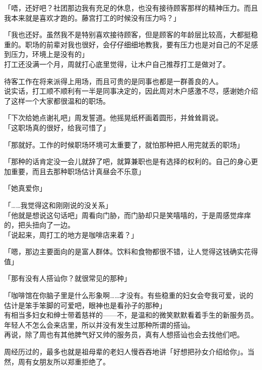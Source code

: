 「唔，还好吧？社团那边我有充足的休息，也没有接待顾客那样的精神压力。而且我本来就是喜欢才跑的。藤宫打工的时候没有压力吗？」

「我也还好。虽然我不是特别喜欢接待顾客，但是顾客的年龄层比较高，大都挺稳重的。职场的前辈对我也很好，会仔仔细细地教我，要有压力也是对自己的不足感到压力，环境上是没有的」\\

打工还没满一个月，周就打心底里觉得，让木户自己推荐打工是做对了。

待客工作在将来派得上用场，而且可贵的是同事也都是一群善良的人。\\

说实话，打工顺不顺利有一半是同事决定的，因此周对木户感激不尽，感谢她介绍了这样一个大家都很温和的职场。

「下次给她点谢礼吧」周发誓道。他摇晃纸杯画着圆形，并耸耸肩说。\\

「这职场真的很好，给我可惜了」

「那就好。工作的时候职场环境可太重要了，就怕那种把人用完就丢的职场」

「那种的话肯定没一会儿就辞了吧，就算兼职也是有选择的权利的。自己的身心更加重要，而且去那种职场估计真昼会不乐意」

「她真爱你」

「……我觉得这和刚刚说的没关系」\\

「他就是想说这句话吧」周看向门胁，而门胁却只是笑嘻嘻的，于是周感觉痒痒的，把头扭向了一边。\\

「说起来，周打工的地方是咖啡店来着？」

「嗯，那边主要面向的是富人群体。饮料和食物都很不错，让人觉得这钱确实花得值」

「那有没有人搭讪你？就很常见的那种」

「咖啡馆在你脑子里是什么形象啊……才没有。有些稳重的妇女会夸我可爱，说的估计是笨手笨脚的可爱吧，眼神也是看孙子的那种」\\

有相当多妇女和绅士带着慈祥的——不，是温和的微笑默默看着手生的新服务员。年轻人不怎么会来店里，所以并没有发生过那种所谓的搭讪。\\

再说，除了周也有其他脾气好又帅的服务员，真有人想搭讪也会去找他们吧。

周经历过的，最多也就是祖母辈的老妇人慢吞吞地讲「好想把孙女介绍给你」。当然，周有女朋友所以郑重拒绝了。\\

